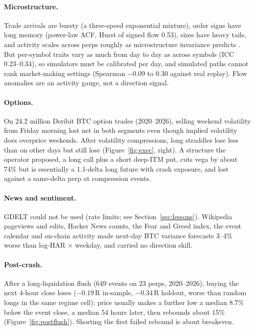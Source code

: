 \documentclass[10pt,a4paper]{article}
\begin{document}
\paragraph{Microstructure.} Trade arrivals are bursty (a three-speed exponential mixture), order signs have long memory (power-law ACF, Hurst of signed flow 0.53), sizes have heavy tails, and activity scales across perps roughly as microstructure invariance predicts \citep{kyle2016}. But per-symbol traits vary as much from day to day as across symbols (ICC 0.23--0.34), so simulators must be calibrated per day, and simulated paths cannot rank market-making settings (Spearman $-0.09$ to $0.30$ against real replay). Flow anomalies are an activity gauge, not a direction signal.

\paragraph{Options.} On 24.2 million Deribit BTC option trades (2020--2026), selling weekend volatility from Friday morning lost net in both segments even though implied volatility does overprice weekends. After volatility compressions, long straddles lose less than on other days but still lose (Figure~\ref{fig:exec}, right). A structure the operator proposed, a long call plus a short deep-ITM put, cuts vega by about 74\% but is essentially a 1.1-delta long future with crash exposure, and lost against a same-delta perp at compression events.

\paragraph{News and sentiment.} GDELT could not be used (rate limits; see Section~\ref{sec:lessons}). Wikipedia pageviews and edits, Hacker News counts, the Fear and Greed index, the event calendar and on-chain activity made next-day BTC variance forecasts 3--4\% worse than log-HAR $\times$ weekday, and carried no direction skill.

\paragraph{Post-crash.} After a long-liquidation flush (649 events on 23 perps, 2020--2026), buying the next 4-hour close loses ($-0.19$\,R in-sample, $-0.34$\,R holdout, worse than random longs in the same regime cell): price usually makes a further low a median 8.7\% below the event close, a median 54 hours later, then rebounds about 15\% (Figure~\ref{fig:postflush}). Shorting the first failed rebound is about breakeven.
\end{document}
